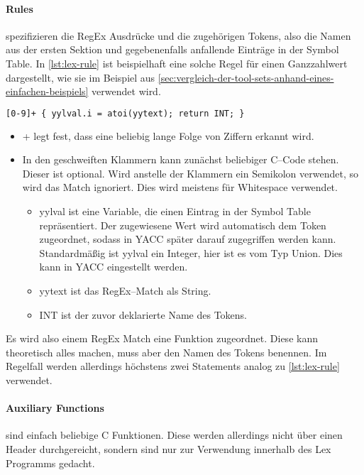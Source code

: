 \paragraph{Rules} spezifizieren die \ac{RegEx} Ausdrücke und die zugehörigen Tokens, also die Namen aus der ersten Sektion und gegebenenfalls anfallende Einträge in der Symbol Table.
In \autoref{lst:lex-rule} ist beispielhaft eine solche Regel für einen Ganzzahlwert dargestellt, wie sie im Beispiel aus \autoref{sec:vergleich-der-tool-sets-anhand-eines-einfachen-beispiels} verwendet wird.
\begin{lstlisting}[label={lst:lex-rule},caption={Lex Regel},language=lex]
[0-9]+ { yylval.i = atoi(yytext); return INT; }
\end{lstlisting}
\begin{itemize}
    \item {\ttfamily [0-9]+} legt fest, dass eine beliebig lange Folge von Ziffern erkannt wird.
    \item In den geschweiften Klammern kann zunächst beliebiger C--Code stehen.
    Dieser ist optional.
    Wird anstelle der Klammern ein Semikolon verwendet, so wird das Match ignoriert.
    Dies wird meistens für Whitespace verwendet.
    \begin{itemize}
        \item {\ttfamily yylval} ist eine Variable, die einen Eintrag in der Symbol Table repräsentiert.
        Der zugewiesene Wert wird automatisch dem Token zugeordnet, sodass in \ac{YACC} später darauf zugegriffen werden kann.
        Standardmäßig ist {\ttfamily yylval} ein Integer, hier ist es vom Typ Union.
        Dies kann in \ac{YACC} eingestellt werden.
        \item {\ttfamily yytext} ist das \acs{RegEx}--Match als String.
        \item {\ttfamily INT} ist der zuvor deklarierte Name des Tokens.
    \end{itemize}
\end{itemize}

Es wird also einem \ac{RegEx} Match eine Funktion zugeordnet.
Diese kann theoretisch alles machen, muss aber den Namen des Tokens benennen.
Im Regelfall werden allerdings höchstens zwei Statements analog zu \autoref{lst:lex-rule} verwendet.

\paragraph{Auxiliary Functions} sind einfach beliebige C Funktionen.
Diese werden allerdings nicht über einen Header durchgereicht, sondern sind nur zur Verwendung innerhalb des Lex Programms gedacht.

